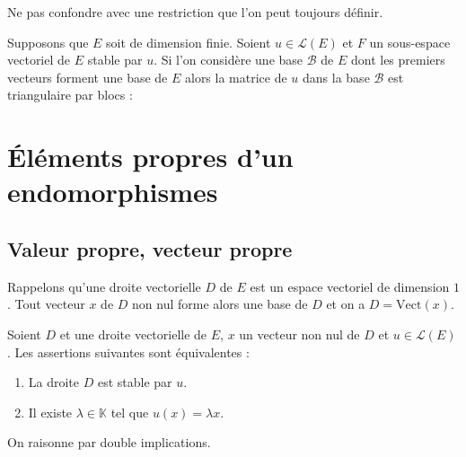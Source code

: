 \documentclass[french,11pt,twoside]{VcCours}
\begin{document}
\begin{Remarque}[\alerte]{} Ne pas confondre avec une restriction que l'on peut toujours définir.
\end{Remarque}


\begin{Remarque}{} Supposons que $E$ soit de dimension finie. Soient $u \in \mathcal{L}(E)$ et $F$ un sous-espace vectoriel de $E$ stable par $u$. Si l'on considère une base $\mathcal{B}$ de $E$ dont les premiers vecteurs forment une base de $E$ alors la matrice de $u$ dans la base $\mathcal{B}$ est triangulaire par blocs :

\vspace{8cm}
\end{Remarque}




\section{Éléments propres d'un endomorphismes}

\subsection{Valeur propre, vecteur propre} 

Rappelons qu'une droite vectorielle $D$ de $E$ est un espace vectoriel de dimension $1$. Tout vecteur $x$ de $D$ non nul forme alors une base de $D$ et on a $D= \textrm{Vect}(x)$.


\begin{Proposition}{}\label{Stable} Soient $D$ et une droite vectorielle de $E$, $x$ un vecteur non nul de $D$ et $u \in \mathcal{L}(E)$. Les assertions suivantes sont équivalentes :

\begin{enumerate}
\item La droite $D$ est stable par $u$.
\item Il existe $\lambda \in \mathbb{K}$ tel que $u(x)= \lambda x$.
\end{enumerate}
\end{Proposition}

\begin{Demonstration}{} On raisonne par double implications.

\vspace{7cm}
%
\end{Demonstration}
\end{document}

